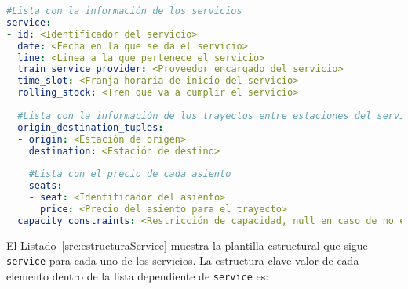 \begin{lstlisting}[language=YAML,
                   frame=none,
                   numbers=none,
                   basicstyle=\ttfamily\normalsize,
                   caption={Estructura de la clave raíz \texttt{service}},
                   label=src:estructuraService,
                   inputencoding=utf8]
#Lista con la información de los servicios
service:
- id: <Identificador del servicio>
  date: <Fecha en la que se da el servicio>
  line: <Linea a la que pertenece el servicio>
  train_service_provider: <Proveedor encargado del servicio>
  time_slot: <Franja horaria de inicio del servicio>
  rolling_stock: <Tren que va a cumplir el servicio>
  
  #Lista con la información de los trayectos entre estaciones del servicio
  origin_destination_tuples:
  - origin: <Estación de origen>
    destination: <Estación de destino>
    
    #Lista con el precio de cada asiento
    seats:
    - seat: <Identificador del asiento>
      price: <Precio del asiento para el trayecto>
  capacity_constraints: <Restricción de capacidad, null en caso de no existir>
\end{lstlisting}

El Listado~\ref{src:estructuraService} muestra la plantilla estructural que sigue \texttt{service} para cada uno de los servicios. La estructura clave-valor de cada elemento dentro de la lista dependiente de \texttt{service} es:

